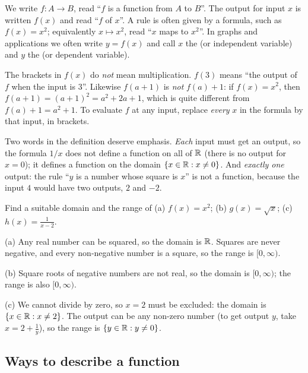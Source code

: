 \begin{notation}
We write $f\colon A \to B$, read ``$f$ is a function from $A$ to $B$''. The
output for input $x$ is written $f(x)$ and read ``$f$ of $x$''. A rule is
often given by a formula, such as $f(x) = x^2$; equivalently
$x \mapsto x^2$, read ``$x$ maps to $x^2$''. In graphs and applications we
often write $y = f(x)$ and call $x$ the  (or independent
variable) and $y$ the  (or dependent variable).
\end{notation}

\begin{pitfall}
The brackets in $f(x)$ do \emph{not} mean multiplication. $f(3)$ means ``the
output of $f$ when the input is $3$''. Likewise $f(a + 1)$ is \emph{not}
$f(a) + 1$: if $f(x) = x^2$, then $f(a+1) = (a+1)^2 = a^2 + 2a + 1$, which is
quite different from $f(a) + 1 = a^2 + 1$. To evaluate $f$ at any input,
replace \emph{every} $x$ in the formula by that input, in brackets.
\end{pitfall}

Two words in the definition deserve emphasis. \emph{Each} input must get an
output, so the formula $1/x$ does not define a function on all of $\mathbb{R}$ (there
is no output for $x = 0$); it defines a function on the domain
$\{x \in \mathbb{R} : x \neq 0\}$. And \emph{exactly one} output: the rule ``$y$ is a
number whose square is $x$'' is not a function, because the input $4$ would
have two outputs, $2$ and $-2$.

\begin{example}\label{ex:domain-range}
Find a suitable domain and the range of (a) $f(x) = x^2$;
(b) $g(x) = \sqrt{x}$; (c) $h(x) = \frac{1}{x-2}$.

\sol (a) Any real number can be squared, so the domain is $\mathbb{R}$. Squares are
never negative, and every non-negative number is a square, so the range is
$[0, \infty)$.

(b) Square roots of negative numbers are not real, so the domain is
$[0, \infty)$; the range is also $[0, \infty)$.

(c) We cannot divide by zero, so $x = 2$ must be excluded: the domain is
$\{x \in \mathbb{R} : x \neq 2\}$. The output can be any non-zero number (to get
output $y$, take $x = 2 + \tfrac1y$), so the range is
$\{y \in \mathbb{R} : y \neq 0\}$.
\end{example}

\subsection{Ways to describe a function}

